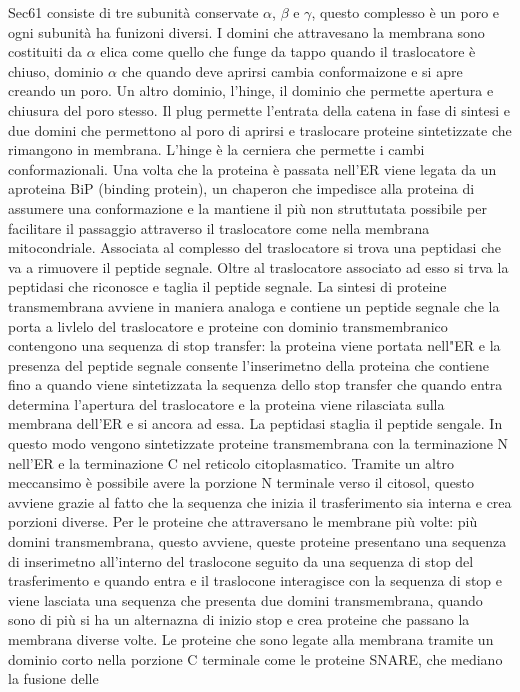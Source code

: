 Sec61 consiste di tre subunit\`a conservate $\alpha$, $\beta$ e $\gamma$, questo complesso \`e un poro e ogni subunit\`a ha funizoni diversi. I domini che attravesano la membrana sono
costituiti da $\alpha$ elica come quello che funge da tappo quando il traslocatore \`e chiuso, dominio $\alpha$ che quando deve aprirsi cambia conformaizone e si apre creando un poro. 
Un altro dominio, l'hinge, il dominio che permette apertura e chiusura del poro stesso. Il plug permette l'entrata della catena in fase di sintesi e due domini che permettono al poro
di aprirsi e traslocare proteine sintetizzate che rimangono in membrana. L'hinge \`e la cerniera che permette i cambi conformazionali. Una volta che la proteina \`e passata nell'ER viene
legata da un aproteina BiP (binding protein), un chaperon che impedisce alla proteina di assumere una conformazione e la mantiene il pi\`u non struttutata possibile per facilitare il 
passaggio attraverso il traslocatore come nella membrana mitocondriale. Associata al complesso del traslocatore si trova una peptidasi che va a rimuovere il peptide segnale. Oltre al
traslocatore associato ad esso si trva la peptidasi che riconosce e taglia il peptide segnale. La sintesi di proteine transmembrana avviene in maniera analoga e contiene un peptide 
segnale che la porta a livlelo del traslocatore e proteine con dominio transmembranico contengono una sequenza di stop transfer: la proteina viene portata nell"ER e la presenza del 
peptide segnale consente l'inserimetno della proteina che contiene fino a quando viene sintetizzata la sequenza dello stop transfer che quando entra determina l'apertura del traslocatore
e la proteina viene rilasciata sulla membrana dell'ER e si ancora ad essa. La peptidasi staglia il peptide sengale. In questo modo vengono sintetizzate proteine transmembrana con la 
terminazione N nell'ER e la terminazione C nel reticolo citoplasmatico. Tramite un altro meccansimo \`e possibile avere la porzione N terminale verso il citosol, questo avviene 
grazie al fatto che la sequenza che inizia il trasferimento sia interna e crea porzioni diverse. Per le proteine che attraversano le membrane pi\`u volte: pi\`u domini transmembrana, 
questo avviene, queste proteine presentano una sequenza di inserimetno all'interno del traslocone seguito da una sequenza di stop del trasferimento e quando entra e il traslocone 
interagisce con la sequenza di stop e viene lasciata una sequenza che presenta due domini transmembrana, quando sono di pi\`u si ha un alternazna di inizio stop e crea proteine che
passano la membrana diverse volte. Le proteine che sono legate alla membrana tramite un dominio corto nella porzione C terminale come le proteine SNARE, che mediano la fusione delle
